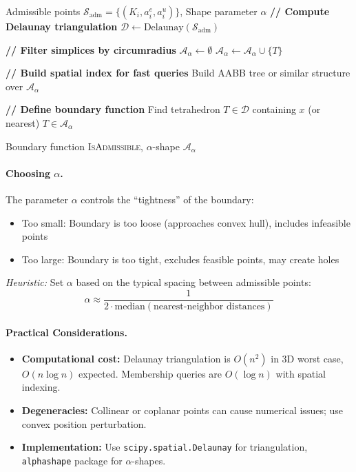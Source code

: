 \begin{algorithm}[H]
\caption{$\alpha$-Shape Boundary Learning}
\label{alg:alpha_boundary}
\begin{algorithmic}[1]
\Require Admissible points $\mathcal{S}_{\text{adm}} = \{(K_i, a^e_i, a^u_i)\}$, Shape parameter $\alpha$
\State \textbf{// Compute Delaunay triangulation}
\State $\mathcal{D} \gets \text{Delaunay}(\mathcal{S}_{\text{adm}})$

\State
\State \textbf{// Filter simplices by circumradius}
\State $\mathcal{A}_\alpha \gets \emptyset$
        \State $\mathcal{A}_\alpha \gets \mathcal{A}_\alpha \cup \{T\}$
    \EndIf
\EndFor

\State
\State \textbf{// Build spatial index for fast queries}
\State Build AABB tree or similar structure over $\mathcal{A}_\alpha$

\State
\State \textbf{// Define boundary function}
    \State Find tetrahedron $T \in \mathcal{D}$ containing $x$ (or nearest)
    \State \Return $T \in \mathcal{A}_\alpha$
\EndFunction

\State \Return Boundary function \textsc{IsAdmissible}, $\alpha$-shape $\mathcal{A}_\alpha$
\end{algorithmic}
\end{algorithm}

\paragraph{Choosing $\alpha$.}
The parameter $\alpha$ controls the ``tightness'' of the boundary:
\begin{itemize}
    \item Too small: Boundary is too loose (approaches convex hull), includes infeasible points
    \item Too large: Boundary is too tight, excludes feasible points, may create holes
\end{itemize}

\textit{Heuristic:} Set $\alpha$ based on the typical spacing between admissible points:
\begin{equation}
    \alpha \approx \frac{1}{2 \cdot \text{median}(\text{nearest-neighbor distances})}
\end{equation}

\paragraph{Practical Considerations.}
\begin{itemize}
    \item \textbf{Computational cost:} Delaunay triangulation is $O(n^2)$ in 3D worst case, $O(n \log n)$ expected. Membership queries are $O(\log n)$ with spatial indexing.
    \item \textbf{Degeneracies:} Collinear or coplanar points can cause numerical issues; use convex position perturbation.
    \item \textbf{Implementation:} Use \texttt{scipy.spatial.Delaunay} for triangulation, \texttt{alphashape} package for $\alpha$-shapes.
\end{itemize}

